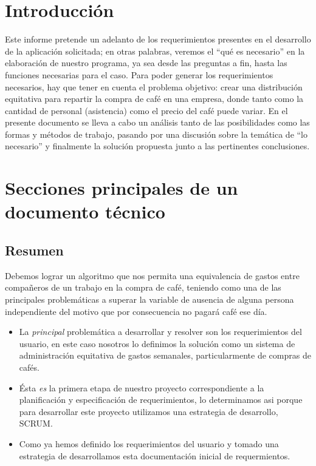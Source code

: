 \documentclass[twocolumn,11pts]{IEEEtran}
\begin{document}
\section{Introducción}

Este informe pretende un adelanto de los requerimientos presentes en el desarrollo de la aplicación solicitada; en otras palabras, veremos el “qué es necesario” en la elaboración de nuestro programa, ya sea desde las preguntas a fin, hasta las funciones necesarias para el caso.
Para poder generar los requerimientos necesarios, hay que tener en cuenta el problema objetivo: crear una distribución equitativa para repartir la compra de café en una empresa, donde tanto como la cantidad de personal (asistencia) como el precio del café puede variar.
En el presente documento se lleva a cabo un análisis tanto de las posibilidades como las formas y métodos de trabajo, pasando por una discusión sobre la temática de “lo necesario” y finalmente la solución propuesta junto a las pertinentes conclusiones.

\section{Secciones principales de un documento técnico}

\subsection{Resumen}
Debemos lograr un algoritmo que nos permita una equivalencia de gastos entre compañeros de un trabajo en la compra de café, teniendo como una de las principales problemáticas a superar la variable de ausencia de alguna persona independiente del motivo que por consecuencia no pagará café ese día.
\begin{itemize}
\item La \emph{principal} problemática a desarrollar y resolver son los requerimientos del usuario, en este caso nosotros lo definimos la solución como un sistema de administración equitativa de gastos semanales, particularmente de compras de cafés.
\item Ésta \emph{es} la primera etapa de nuestro proyecto correspondiente a la planificación y especificación de requerimientos, lo determinamos asi porque para desarrollar este proyecto utilizamos una estrategia de desarrollo, SCRUM.
\item Como ya hemos definido los requerimientos del usuario y tomado una estrategia de desarrollamos esta documentación inicial de requermientos.
\end{itemize}
\end{document}
